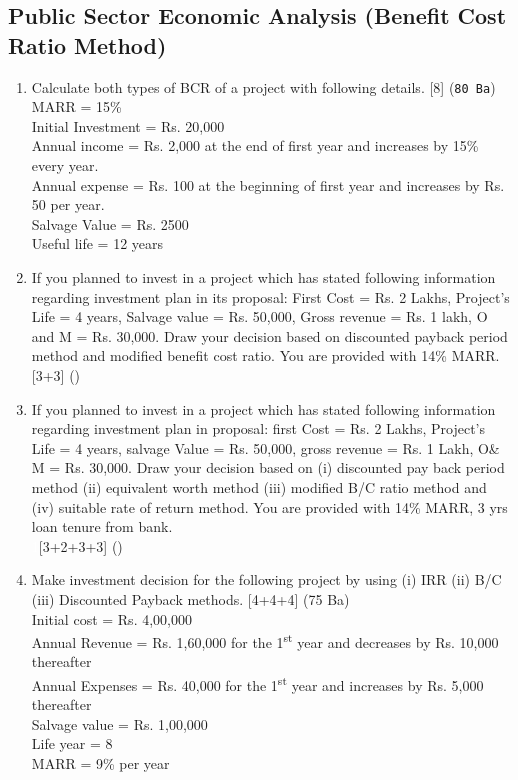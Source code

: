 \documentclass[12pt]{article}
\newcommand{\enter}{\\\textcolor{white}{1}}
\newcommand{\super}[1]{\textsuperscript{#1}}
\begin{document}
\subsection{Public Sector Economic Analysis (Benefit Cost Ratio Method)}
\begin{enumerate}[noitemsep, topsep = 0pt]
	\item Calculate both types of BCR of a project with following details. \hfill [8] (\texttt{80 Ba})\\
	MARR = 15\%\\
	Initial Investment = Rs. 20,000\\
	Annual income = Rs. 2,000 at the end of first year and increases by 15\% every year.\\
	Annual expense = Rs. 100 at the beginning of first year and increases by Rs. 50 per year.\\
	Salvage Value = Rs. 2500\\
	Useful life = 12 years
	
	\item If you planned to invest in a project which has stated following information regarding investment plan in its proposal: First Cost = Rs. 2 Lakhs, Project's Life = 4 years, Salvage value = Rs. 50,000, Gross revenue = Rs. 1 lakh, O and M = Rs. 30,000. Draw your decision based on discounted payback period method and modified benefit cost ratio. You are provided with 14\% MARR. \hfill [3+3] ()
	
	\item If you planned to invest in a project which has stated following information regarding investment plan in proposal: first Cost = Rs. 2 Lakhs, Project's Life = 4 years, salvage Value = Rs. 50,000, gross revenue = Rs. 1 Lakh, O\& M = Rs. 30,000. Draw your decision based on (i) discounted pay back period method (ii) equivalent worth method (iii) modified B/C ratio method and (iv) suitable rate of return method. You are provided with 14\% MARR, 3 yrs loan tenure from bank. 
	\enter\hfill [3+2+3+3] ()
	
	\item Make investment decision for the following project by using (i) IRR (ii) B/C (iii) Discounted Payback methods. \hfill [4+4+4] (75 Ba)\\
	Initial cost = Rs. 4,00,000\\
	Annual Revenue = Rs. 1,60,000 for the 1\super{st} year and decreases by Rs. 10,000 thereafter\\
	Annual Expenses = Rs. 40,000 for the 1\super{st} year and increases by Rs. 5,000 thereafter\\
	Salvage value = Rs. 1,00,000\\
	Life year = 8\\
	MARR = 9\% per year
	

\end{enumerate}
\end{document}
